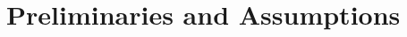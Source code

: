 





\maketitle

\begin{abstract}
	This note complements the work \cite{costello2012pairings}, which provides a detailed introduction to the Weil pairing and Tate pairing, by more details and proofs omitted in the original work.
\end{abstract}

\section{Preliminaries and Assumptions}

